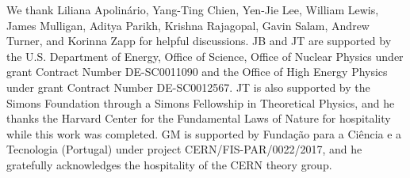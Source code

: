 \documentclass[aps,prl,twocolumn,preprintnumbers,superscriptaddress,showpacs,floatfix, nofootinbib]{revtex4-1}
\begin{document}
\begin{acknowledgments}
We thank Liliana Apolin\'ario, Yang-Ting Chien, Yen-Jie Lee, William Lewis, James Mulligan, Aditya Parikh, Krishna Rajagopal, Gavin Salam, Andrew Turner, and Korinna Zapp for helpful discussions.
%
JB and JT are supported by the U.S. Department of Energy, Office of Science, Office of Nuclear Physics under grant Contract Number DE-SC0011090 and the Office of High Energy Physics under grant Contract Number DE-SC0012567. 
%
JT is also supported by the Simons Foundation through a Simons Fellowship in Theoretical Physics, and he thanks the Harvard Center for the Fundamental Laws of Nature for hospitality while this work was completed.
GM is supported by Funda\c c\~ao para a Ci\^encia e a Tecnologia (Portugal) under project CERN/FIS-PAR/0022/2017, and he gratefully acknowledges the hospitality of the CERN theory group.
\end{acknowledgments}

 

\end{document}
